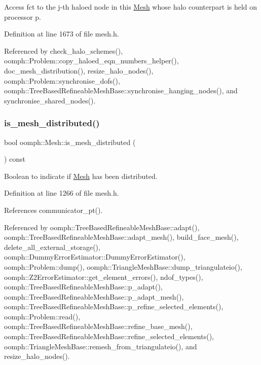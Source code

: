 Access fct to the j-\/th haloed node in this \hyperlink{classoomph_1_1Mesh}{Mesh} whose halo counterpart is held on processor p. 



Definition at line 1673 of file mesh.\+h.



Referenced by check\+\_\+halo\+\_\+schemes(), oomph\+::\+Problem\+::copy\+\_\+haloed\+\_\+eqn\+\_\+numbers\+\_\+helper(), doc\+\_\+mesh\+\_\+distribution(), resize\+\_\+halo\+\_\+nodes(), oomph\+::\+Problem\+::synchronise\+\_\+dofs(), oomph\+::\+Tree\+Based\+Refineable\+Mesh\+Base\+::synchronise\+\_\+hanging\+\_\+nodes(), and synchronise\+\_\+shared\+\_\+nodes().

\mbox{\label{classoomph_1_1Mesh_a1ab35b022b95f2d28c53aa58859bd6b5}} 
\subsubsection{\texorpdfstring{is\+\_\+mesh\+\_\+distributed()}{is\_mesh\_distributed()}}
{\footnotesize\ttfamily bool oomph\+::\+Mesh\+::is\+\_\+mesh\+\_\+distributed (\begin{DoxyParamCaption}{ }\end{DoxyParamCaption}) const\hspace{0.3cm}{\ttfamily [inline]}}



Boolean to indicate if \hyperlink{classoomph_1_1Mesh}{Mesh} has been distributed. 



Definition at line 1266 of file mesh.\+h.



References communicator\+\_\+pt().



Referenced by oomph\+::\+Tree\+Based\+Refineable\+Mesh\+Base\+::adapt(), oomph\+::\+Tree\+Based\+Refineable\+Mesh\+Base\+::adapt\+\_\+mesh(), build\+\_\+face\+\_\+mesh(), delete\+\_\+all\+\_\+external\+\_\+storage(), oomph\+::\+Dummy\+Error\+Estimator\+::\+Dummy\+Error\+Estimator(), oomph\+::\+Problem\+::dump(), oomph\+::\+Triangle\+Mesh\+Base\+::dump\+\_\+triangulateio(), oomph\+::\+Z2\+Error\+Estimator\+::get\+\_\+element\+\_\+errors(), ndof\+\_\+types(), oomph\+::\+Tree\+Based\+Refineable\+Mesh\+Base\+::p\+\_\+adapt(), oomph\+::\+Tree\+Based\+Refineable\+Mesh\+Base\+::p\+\_\+adapt\+\_\+mesh(), oomph\+::\+Tree\+Based\+Refineable\+Mesh\+Base\+::p\+\_\+refine\+\_\+selected\+\_\+elements(), oomph\+::\+Problem\+::read(), oomph\+::\+Tree\+Based\+Refineable\+Mesh\+Base\+::refine\+\_\+base\+\_\+mesh(), oomph\+::\+Tree\+Based\+Refineable\+Mesh\+Base\+::refine\+\_\+selected\+\_\+elements(), oomph\+::\+Triangle\+Mesh\+Base\+::remesh\+\_\+from\+\_\+triangulateio(), and resize\+\_\+halo\+\_\+nodes().

